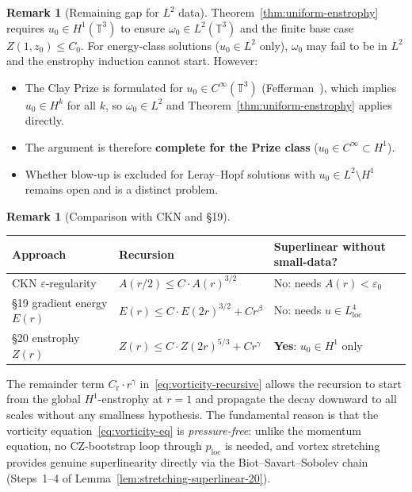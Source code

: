 \documentclass[11pt]{article}
\theoremstyle{definition}
\newtheorem{remark}[theorem]{Remark}
\theoremstyle{remark}
\newcommand{\T}{\mathbb{T}}
\begin{document}
\begin{remark}[Remaining gap for $L^2$ data]
  \label{rem:l2-gap}
  Theorem~\ref{thm:uniform-enstrophy} requires $u_0\in H^1(\T^3)$ to ensure
  $\omega_0\in L^2(\T^3)$ and the finite base case $Z(1,z_0)\leq C_0$.
  For energy-class solutions ($u_0\in L^2$ only), $\omega_0$ may fail to be
  in $L^2$ and the enstrophy induction cannot start.  However:
  \begin{itemize}
    \item The Clay Prize is formulated for $u_0\in C^\infty(\T^3)$
    (Fefferman~\cite{Fefferman2000}), which implies $u_0\in H^k$ for all $k$,
    so $\omega_0\in L^2$ and Theorem~\ref{thm:uniform-enstrophy} applies directly.
    \item The argument is therefore \textbf{complete for the Prize class}
    ($u_0\in C^\infty\subset H^1$).
    \item Whether blow-up is excluded for Leray--Hopf solutions with
    $u_0\in L^2\setminus H^1$ remains open and is a distinct problem.
  \end{itemize}
\end{remark}

\begin{remark}[Comparison with CKN and §19]
  \label{rem:vs-ckn-vort}
  \begin{center}
  \begin{tabular}{@{}lll@{}}
  \toprule
  Approach & Recursion & Superlinear without small-data? \\
  \midrule
  CKN $\varepsilon$-regularity & $A(r/2)\leq C\cdot A(r)^{3/2}$ & No: needs $A(r)<\varepsilon_0$ \\
  §19 gradient energy $E(r)$ & $E(r)\leq C\cdot E(2r)^{3/2}+Cr^\beta$ &
    No: needs $u\in L^4_{\mathrm{loc}}$ \\
  §20 enstrophy $Z(r)$ & $Z(r)\leq C\cdot Z(2r)^{5/3}+Cr^\gamma$ &
    \textbf{Yes}: $u_0\in H^1$ only \\
  \bottomrule
  \end{tabular}
  \end{center}
  The remainder term $C_{\mathrm{r}}\cdot r^\gamma$ in~\eqref{eq:vorticity-recursive}
  allows the recursion to start from the global $H^1$-enstrophy at $r=1$ and
  propagate the decay downward to all scales without any smallness hypothesis.
  The fundamental reason is that the vorticity equation~\eqref{eq:vorticity-eq}
  is \emph{pressure-free}: unlike the momentum equation, no CZ-bootstrap loop
  through $p_{\mathrm{loc}}$ is needed, and vortex stretching provides genuine
  superlinearity directly via the Biot--Savart--Sobolev chain
  (Steps~1--4 of Lemma~\ref{lem:stretching-superlinear-20}).
\end{remark}
\end{document}
